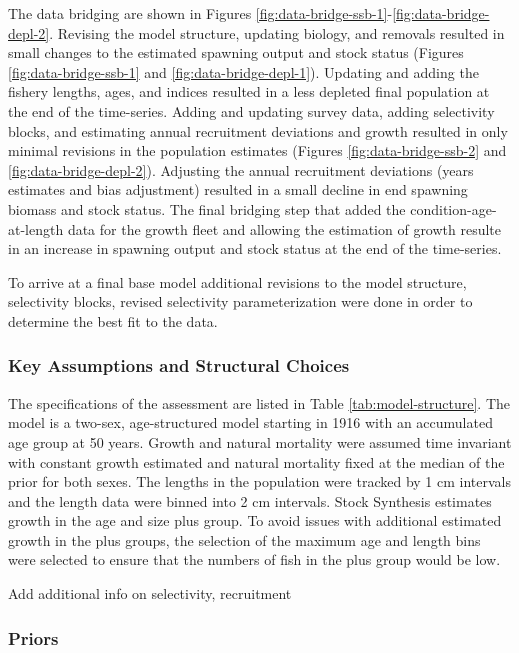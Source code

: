 \documentclass[11pt,
  english,
  letterpaper,
]{article}
\begin{document}
The data bridging are shown in Figures \ref{fig:data-bridge-ssb-1}-\ref{fig:data-bridge-depl-2}. Revising the model structure, updating biology, and removals resulted in small changes to the estimated spawning output and stock status (Figures \ref{fig:data-bridge-ssb-1} and \ref{fig:data-bridge-depl-1}). Updating and adding the fishery lengths, ages, and indices resulted in a less depleted final population at the end of the time-series. Adding and updating survey data, adding selectivity blocks, and estimating annual recruitment deviations and growth resulted in only minimal revisions in the population estimates (Figures \ref{fig:data-bridge-ssb-2} and \ref{fig:data-bridge-depl-2}). Adjusting the annual recruitment deviations (years estimates and bias adjustment) resulted in a small decline in end spawning biomass and stock status. The final bridging step that added the condition-age-at-length data for the growth fleet and allowing the estimation of growth resulte in an increase in spawning output and stock status at the end of the time-series.

To arrive at a final base model additional revisions to the model structure, selectivity blocks, revised selectivity parameterization were done in order to determine the best fit to the data.

\hypertarget{key-assumptions-and-structural-choices}{%
\subsubsection{Key Assumptions and Structural Choices}\label{key-assumptions-and-structural-choices}}

The specifications of the assessment are listed in Table \ref{tab:model-structure}. The model is a two-sex, age-structured model starting in 1916 with an accumulated age group at 50 years. Growth and natural mortality were assumed time invariant with constant growth estimated and natural mortality fixed at the median of the prior for both sexes. The lengths in the population were tracked by 1 cm intervals and the length data were binned into 2 cm intervals. Stock Synthesis estimates growth in the age and size plus group. To avoid issues with additional estimated growth in the plus groups, the selection of the maximum age and length bins were selected to ensure that the numbers of fish in the plus group would be low.

Add additional info on selectivity, recruitment

\hypertarget{priors}{%
\subsubsection{Priors}\label{priors}}
\end{document}
